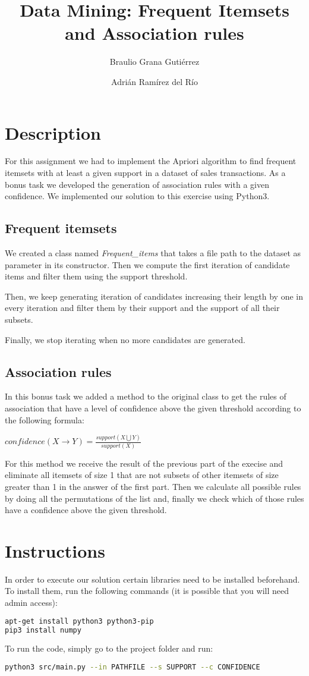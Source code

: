 \documentclass[12pt, a4paper]{article}
\title{Data Mining: Frequent Itemsets and Association rules}
\author{Braulio Grana Guti\'errez \and Adri\'an Ram\'irez del R\'io}
\begin{document}
\maketitle

\section{Description}
For this assignment we had to implement the Apriori algorithm to find frequent itemsets with at least a given support in a dataset of sales transactions. As a bonus task we developed the generation of association rules with a given confidence. We implemented our solution to this exercise using Python3.

\subsection{Frequent itemsets}
We created a class named \emph{Frequent\_items} that takes a file path to the dataset as parameter in its constructor. Then we compute the first iteration of candidate items and filter them using the support threshold.

Then, we keep generating iteration of candidates increasing their length by one in every iteration and filter them by their support and the support of all their subsets.

Finally, we stop iterating when no more candidates are generated.

\subsection{Association rules}
In this bonus task we added a method to the original class to get the rules of association that have a level of confidence above  the given threshold according to the following formula:
\begin{center}
\emph{$confidence(X \rightarrow Y) = \frac{support(X \bigcup Y)}{support(X)}$}
\end{center}

For this method we receive the result of the previous part of the execise and eliminate all itemsets of size 1 that are not subsets of other itemsets of size greater than 1 in the answer of the first part. Then we calculate all possible rules by doing all the permutations of the list and, finally we check which of those rules have a confidence above the given threshold.

\section{Instructions}
In order to execute our solution certain libraries need to be installed beforehand. To install them, run the following commands (it is possible that you will need admin access):

\begin{lstlisting}[language=bash]
apt-get install python3 python3-pip
pip3 install numpy
\end{lstlisting}

To run the code, simply go to the project folder and run:
\begin{lstlisting}[language=bash]
python3 src/main.py --in PATHFILE --s SUPPORT --c CONFIDENCE
\end{lstlisting}
\end{document}
